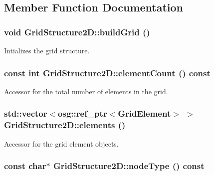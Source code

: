 \subsection{Member Function Documentation}
\hypertarget{class_grid_structure2_d_a35f694a9b0e064bfaebff7c382ba2ecb}{
\subsubsection[{buildGrid}]{\setlength{\rightskip}{0pt plus 5cm}void GridStructure2D::buildGrid ()}}
\label{class_grid_structure2_d_a35f694a9b0e064bfaebff7c382ba2ecb}
Intializes the grid structure. \hypertarget{class_grid_structure2_d_aab843adb6bb6ba3e2b884591ba6738fe}{
\subsubsection[{elementCount}]{\setlength{\rightskip}{0pt plus 5cm}const int GridStructure2D::elementCount () const}}
\label{class_grid_structure2_d_aab843adb6bb6ba3e2b884591ba6738fe}
Accessor for the total number of elements in the grid. \hypertarget{class_grid_structure2_d_a5faabe450979fc40d520b7237e3be6d7}{
\subsubsection[{elements}]{\setlength{\rightskip}{0pt plus 5cm}std::vector$<$osg::ref\_\-ptr$<${\bf GridElement}$>$ $>$ GridStructure2D::elements ()}}
\label{class_grid_structure2_d_a5faabe450979fc40d520b7237e3be6d7}
Accessor for the grid element objects. \hypertarget{class_grid_structure2_d_af994372e96543559c040b40bb6969bfa}{
\subsubsection[{nodeType}]{\setlength{\rightskip}{0pt plus 5cm}const char$\ast$ GridStructure2D::nodeType () const}}
